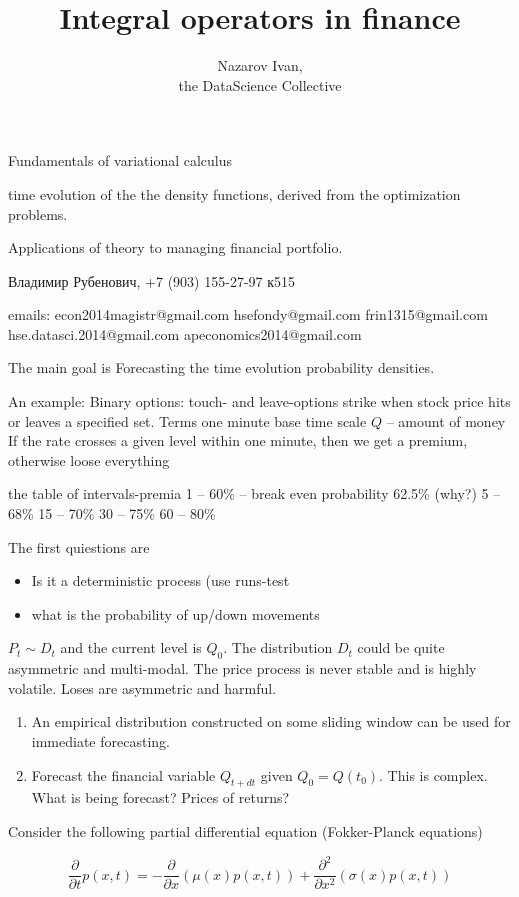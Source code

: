 \documentclass[a4paper]{article}
\title{Integral operators in finance}
\author{Nazarov Ivan, \rus{101мНОД(ИССА)}\\the DataScience Collective}
\newcommand{\brac}[1]{{\left ( #1 \right )}}
\newcommand{\rus}[1]{\foreignlanguage{russian}{#1}}
\begin{document}
\maketitle


Fundamentals of variational calculus

time evolution of the the density functions, derived from the optimization problems.

Applications of theory to managing financial portfolio.

\rus{Владимир Рубенович, +7 (903) 155-27-97 к515 }

emails:
econ2014magistr@gmail.com
hsefondy@gmail.com
frin1315@gmail.com
hse.datasci.2014@gmail.com
apeconomics2014@gmail.com


The main goal is Forecasting the time evolution probability densities.

An example:
Binary options: touch- and leave-options strike when stock price hits or leaves a specified set.
	Terms one minute base time scale
	$Q$ -- amount of money
	If the rate crosses a given level within one minute, then we get a premium, otherwise loose everything

the table of intervals-premia
	 1 -- 60\% -- break even probability 62.5\% (why?)
	 5 -- 68\%
	15 -- 70\%
	30 -- 75\%
	60 -- 80\%

The first quiestions are \begin{itemize}
	\item Is it a deterministic process (use runs-test
	\item what is the probability of up/down movements
\end{itemize}

$P_t\sim D_t$ and the current level is $Q_0$.
The distribution $D_t$ could be quite asymmetric and multi-modal.
The price process is never stable and is highly volatile.
Loses are asymmetric and harmful.

\begin{enumerate}
	\item An empirical distribution constructed on some sliding window can be used for immediate forecasting.
	\item Forecast the financial variable $Q_{t+dt}$ given $Q_0 = Q(t_0)$. This is complex.
	What is being forecast? Prices of returns?
\end{enumerate}

Consider the following partial differential equation (Fokker-Planck equations)

\[\frac{\partial}{\partial t} p(x,t) = -\frac{\partial}{\partial x} \brac{ \mu(x) p(x,t) } + \frac{\partial^2}{\partial x^2} \brac{ \sigma(x) p(x,t) } \]
\end{document}
